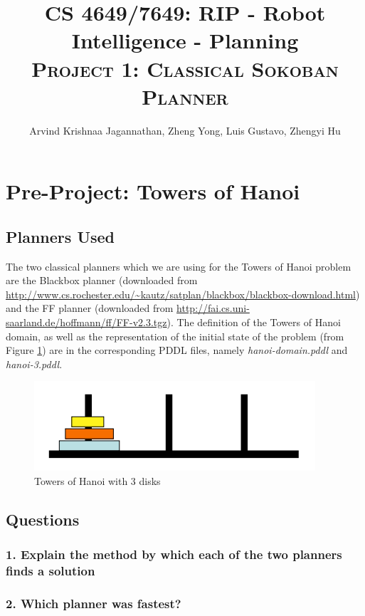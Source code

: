 \documentclass[10pt, letter]{article}
\newcommand{\doctitle}{%
CS 4649/7649: RIP - Robot Intelligence - Planning}
\begin{document}
\title{\textbf{\doctitle} \\\textsc{Project 1: Classical Sokoban Planner}}
  \author {Arvind Krishnaa Jagannathan, Zheng Yong, Luis Gustavo, Zhengyi Hu}%
   \date{}
\maketitle

\section{Pre-Project: Towers of Hanoi}
\subsection*{Planners Used}
The two classical planners which we are using for the Towers of Hanoi problem are the Blackbox planner \cite{kautz1998blackbox} (downloaded from \url{http://www.cs.rochester.edu/~kautz/satplan/blackbox/blackbox-download.html}) and the FF planner \cite{hoffmann2001fast} (downloaded from \url{http://fai.cs.uni-saarland.de/hoffmann/ff/FF-v2.3.tgz}). The definition of the Towers of Hanoi domain, as well as the representation of the initial state of the problem (from Figure \ref{fig1}) are in the corresponding PDDL files, namely \textit{hanoi-domain.pddl} and \textit{hanoi-3.pddl}.

\begin{figure}[h!]
  \centering
    \includegraphics[scale = 0.3]{images/hanoi1}
    \caption{Towers of Hanoi with 3 disks}
  \label{fig1}
\end{figure}

\subsection{Questions}
\subsubsection*{1. Explain the method by which each of the two planners finds a solution}
\subsubsection*{2. Which planner was fastest?}
\end{document}
